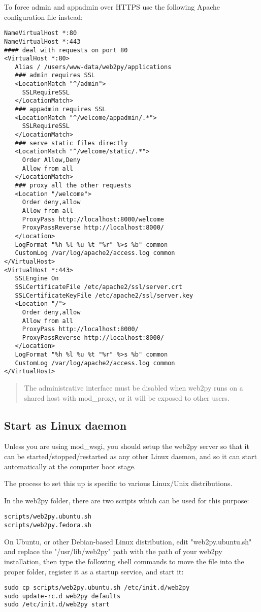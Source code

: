 \documentclass[justified,sixbynine,notoc]{tufte-book}
\begin{document}
\begin{fullwidth}
To force admin and appadmin over HTTPS use the following Apache configuration file instead:
\begin{lstlisting}
NameVirtualHost *:80
NameVirtualHost *:443
#### deal with requests on port 80
<VirtualHost *:80>
   Alias / /users/www-data/web2py/applications
   ### admin requires SSL
   <LocationMatch "^/admin">
     SSLRequireSSL
   </LocationMatch>
   ### appadmin requires SSL
   <LocationMatch "^/welcome/appadmin/.*">
     SSLRequireSSL
   </LocationMatch>
   ### serve static files directly
   <LocationMatch "^/welcome/static/.*">
     Order Allow,Deny
     Allow from all
   </LocationMatch>
   ### proxy all the other requests
   <Location "/welcome">
     Order deny,allow
     Allow from all
     ProxyPass http://localhost:8000/welcome
     ProxyPassReverse http://localhost:8000/
   </Location>
   LogFormat "%h %l %u %t "%r" %>s %b" common
   CustomLog /var/log/apache2/access.log common
</VirtualHost>
<VirtualHost *:443>
   SSLEngine On
   SSLCertificateFile /etc/apache2/ssl/server.crt
   SSLCertificateKeyFile /etc/apache2/ssl/server.key
   <Location "/">
     Order deny,allow
     Allow from all
     ProxyPass http://localhost:8000/
     ProxyPassReverse http://localhost:8000/
   </Location>
   LogFormat "%h %l %u %t "%r" %>s %b" common
   CustomLog /var/log/apache2/access.log common
</VirtualHost>
\end{lstlisting}

\begin{quote}The administrative interface must be disabled when web2py runs on a shared host with mod\_proxy, or it will be exposed to other users.\end{quote}
\goodbreak\subsection{Start as Linux daemon}

Unless you are using mod\_wsgi, you should setup the web2py server so that it can be started/stopped/restarted as any other Linux daemon, and so it can start automatically at the computer boot stage.

The process to set this up is specific to various Linux/Unix distributions.

In the web2py folder, there are two scripts which can be used for this purpose:
\begin{lstlisting}
scripts/web2py.ubuntu.sh
scripts/web2py.fedora.sh
\end{lstlisting}

On Ubuntu, or other Debian-based Linux distribution, edit "web2py.ubuntu.sh" and replace the "/usr/lib/web2py" path with the path of your web2py installation, then type the following shell commands to move the file into the proper folder, register it as a startup service, and start it:
\begin{lstlisting}
sudo cp scripts/web2py.ubuntu.sh /etc/init.d/web2py
sudo update-rc.d web2py defaults
sudo /etc/init.d/web2py start
\end{lstlisting}


\end{fullwidth}
\end{document}
